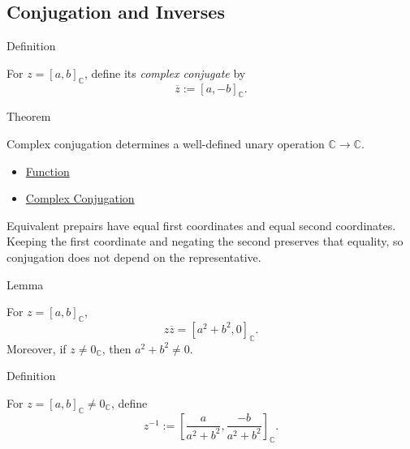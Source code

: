 \subsection*{Conjugation and Inverses}

\begin{definitionbox}{Definition}
\begin{definition}
\label{def:complex-conjugation}
For \(z=[a,b]_{\mathbb{C}}\), define its \emph{complex conjugate} by
\[
\overline{z}:=[a,-b]_{\mathbb{C}}.
\]
\end{definition}
\end{definitionbox}

\begin{theorembox}{Theorem}
\begin{theorem}
\label{thm:complex-conjugation-well-defined}
Complex conjugation determines a well-defined unary operation
\(\mathbb{C}\to\mathbb{C}\).
\end{theorem}
\end{theorembox}

\begin{dependencies}
\begin{itemize}
  \item \hyperref[def:function]{Function}
  \item \hyperref[def:complex-conjugation]{Complex Conjugation}
\end{itemize}
\end{dependencies}

\begin{remark*}
Equivalent prepairs have equal first coordinates and equal second coordinates.
Keeping the first coordinate and negating the second preserves that equality,
so conjugation does not depend on the representative.
\end{remark*}

\begin{lemmabox}{Lemma}
\begin{lemma}
\label{lem:complex-product-with-conjugate}
For \(z=[a,b]_{\mathbb{C}}\),
\[
z\overline{z}=[a^2+b^2,0]_{\mathbb{C}}.
\]
Moreover, if \(z\ne 0_{\mathbb{C}}\), then \(a^2+b^2\ne 0\).
\end{lemma}
\end{lemmabox}

\begin{definitionbox}{Definition}
\begin{definition}
\label{def:multiplicative-inverse-on-c}
For \(z=[a,b]_{\mathbb{C}}\ne 0_{\mathbb{C}}\), define
\[
z^{-1}
:=
\left[\frac{a}{a^2+b^2},\frac{-b}{a^2+b^2}\right]_{\mathbb{C}}.
\]
\end{definition}
\end{definitionbox}

